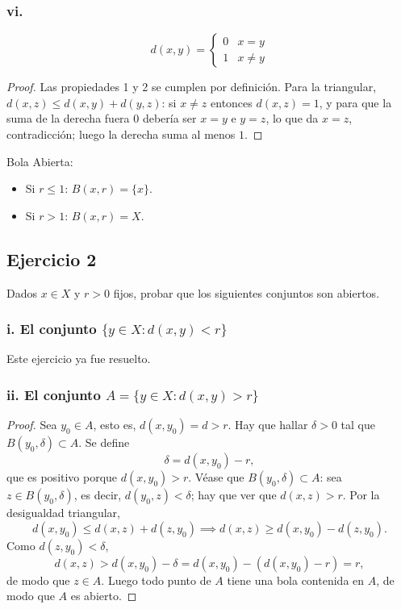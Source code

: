 \documentclass[11pt, a4paper]{article}
\begin{document}
\subsubsection*{vi.}
$$ d(x, y) = \begin{cases} 0 & x=y \\ 1 & x \neq y \end{cases} $$

\begin{proof}
Las propiedades 1 y 2 se cumplen por definición. Para la triangular, $d(x, z) \le d(x, y) + d(y, z)$:
si $x \neq z$ entonces $d(x, z) = 1$, y para que la suma de la derecha fuera $0$ debería ser $x = y$
e $y = z$, lo que da $x = z$, contradicción; luego la derecha suma al menos $1$.
\end{proof}

Bola Abierta:
\begin{itemize}
    \item Si $r \le 1$: $B(x, r) = \{x\}$.
    \item Si $r > 1$: $B(x, r) = X$.
\end{itemize}

\subsection*{Ejercicio 2}

Dados $x \in X$ y $r > 0$ fijos, probar que los siguientes conjuntos son abiertos.

\subsubsection*{i. El conjunto $\{y \in X : d(x, y) < r\}$}

Este ejercicio ya fue resuelto.

\subsubsection*{ii. El conjunto $A = \{y \in X : d(x, y) > r\}$}

\begin{proof}
Sea $y_0 \in A$, esto es, $d(x, y_0) = d > r$. Hay que hallar $\delta > 0$ tal que
$B(y_0, \delta) \subset A$. Se define
$$ \delta = d(x, y_0) - r, $$
que es positivo porque $d(x, y_0) > r$. Véase que $B(y_0, \delta) \subset A$: sea
$z \in B(y_0, \delta)$, es decir, $d(y_0, z) < \delta$; hay que ver que $d(x, z) > r$. Por la
desigualdad triangular,
$$ d(x, y_0) \le d(x, z) + d(z, y_0) \implies d(x, z) \ge d(x, y_0) - d(z, y_0). $$
Como $d(z, y_0) < \delta$,
$$ d(x, z) > d(x, y_0) - \delta = d(x, y_0) - (d(x, y_0) - r) = r, $$
de modo que $z \in A$. Luego todo punto de $A$ tiene una bola contenida en $A$, de modo que $A$ es
abierto.
\end{proof}
\end{document}
